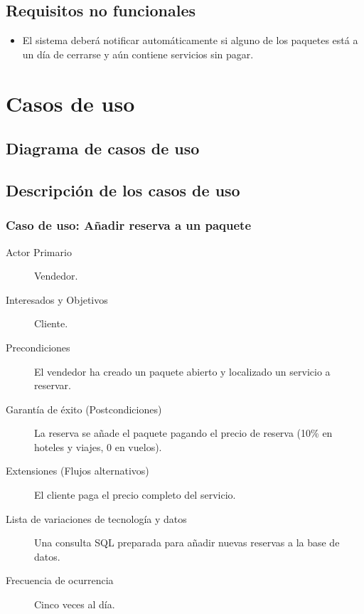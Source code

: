 \documentclass[12pt,a4paper,titlepage]{article}
\begin{document}
\subsection{Requisitos no funcionales}

\begin{itemize}
\item El sistema deberá notificar automáticamente si alguno de los paquetes está a un día de cerrarse y aún contiene servicios sin pagar.
\end{itemize}

\section{Casos de uso}
\subsection{Diagrama de casos de uso}

\newpage
\subsection{Descripción de los casos de uso}
\subsubsection{Caso de uso: Añadir reserva a un paquete}
\begin{description}
\item[Actor Primario] Vendedor.
\item[Interesados y Objetivos] Cliente.
\item[Precondiciones] El vendedor ha creado un paquete abierto y localizado un servicio a reservar.
\item[Garantía de éxito (Postcondiciones)] La reserva se añade el paquete pagando el precio de reserva (10\% en hoteles y viajes, 0 en vuelos).
\item[Extensiones (Flujos alternativos)] El cliente paga el precio completo del servicio.
\item[Lista de variaciones de tecnología y datos] Una consulta SQL preparada para añadir nuevas reservas a la base de datos.
\item[Frecuencia de ocurrencia] Cinco veces al día.
\end{description}
\end{document}
